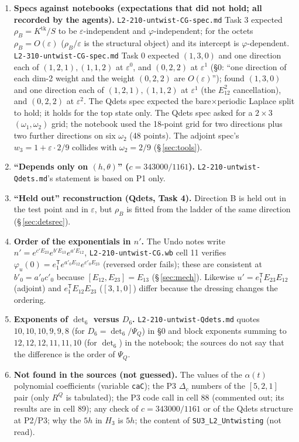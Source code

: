 \documentclass[10pt]{article}
\newcommand{\nb}[1]{\texttt{#1}}
\begin{document}
\begin{enumerate}
\item \textbf{Specs against notebooks (expectations that did not hold; all recorded by the agents).} \nb{L2-\allowbreak{}210-\allowbreak{}untwist-\allowbreak{}CG-\allowbreak{}spec.\allowbreak{}md} Task 3 expected $\rho_B=K^{\mathrm{tk}}/S$ to be $\varepsilon$-independent and $\varphi$-independent; for the octets $\rho_B=O(\varepsilon)$ ($\rho_B/\varepsilon$ is the structural object) and its intercept is $\varphi$-dependent. \nb{L2-\allowbreak{}310-\allowbreak{}untwist-\allowbreak{}CG-\allowbreak{}spec.\allowbreak{}md} Task 0 expected $(1,3,0)$ and one direction each of $(1,2,1),(1,1,2)$ at $\varepsilon^0$, and $(0,2,2)$ at $\varepsilon^1$ (\S{}0: ``one direction of each dim-2 weight and the weight $(0,2,2)$ are $O(\varepsilon)$''); found $(1,3,0)$ and one direction each of $(1,2,1),(1,1,2)$ at $\varepsilon^1$ (the $E_{12}^2$ cancellation), and $(0,2,2)$ at $\varepsilon^2$. The Qdets spec expected the bare$\times$periodic Laplace split to hold; it holds for the top state only. The Qdets spec asked for a $2\times3$ $(\omega_1,\omega_2)$ grid; the notebook used the 18-point grid for two directions plus two further directions on six $\omega_2$ (48 points). The adjoint spec's $w_3=1+\varepsilon\cdot2/9$ collides with $\omega_2=2/9$ (\S\,\ref{sec:tools}).
\item \textbf{``Depends only on $(h,\theta)$'' ($c=343000/1161$).} \nb{L2-\allowbreak{}210-\allowbreak{}untwist-\allowbreak{}Qdets.\allowbreak{}md}'s statement is based on P1 only.
\item \textbf{``Held out'' reconstruction (Qdets, Task 4).} Direction B is held out in the test point and in $\varepsilon$, but $\rho_B$ is fitted from the ladder of the same direction (\S\,\ref{sec:detsrec}).
\item \textbf{Order of the exponentials in $n'$.} The Undo notes write $n'=e^{c'E_{23}}e^{b'E_{13}}e^{a'E_{12}}$, \nb{L2-\allowbreak{}210-\allowbreak{}untwist-\allowbreak{}CG.\allowbreak{}wb} cell 11 verifies $\varphi_u(0)=e_1^{\mathsf T}e^{a'_0E_{12}}e^{c'_0E_{23}}$ (reversed order fails); these are consistent at $b'_0=a'_0c'_0$ because $[E_{12},E_{23}]=E_{13}$ (\S\,\ref{sec:mech}). Likewise $u'=e_1^{\mathsf T}E_{23}E_{12}$ (adjoint) and $e_1^{\mathsf T}E_{12}E_{23}$ ($[3,1,0]$) differ because the dressing changes the ordering.
\item \textbf{Exponents of $\det_6$ versus $D_6$.} \nb{L2-\allowbreak{}210-\allowbreak{}untwist-\allowbreak{}Qdets.\allowbreak{}md} quotes $10,10,10,9,9,8$ (for $D_6=\det_6/\Psi_Q$) in \S{}0 and block exponents summing to $12,12,12,11,11,10$ (for $\det_6$) in the notebook; the sources do not say that the difference is the order of $\Psi_Q$.
\item \textbf{Not found in the sources (not guessed).} The values of the $\alpha(t)$ polynomial coefficients (variable \nb{caC}); the P3 $\Delta_c$ numbers of the $[5,2,1]$ pair (only $R^Q$ is tabulated); the P3 code call in cell 88 (commented out; its results are in cell 89); any check of $c=343000/1161$ or of the Qdets structure at P2/P3; why the $5h$ in $H_3$ is $5h$; the content of \nb{SU3\_\allowbreak{}L2\_\allowbreak{}Untwisting} (not read).
\end{enumerate}
\end{document}
